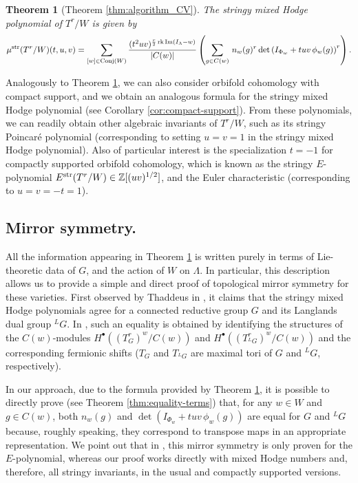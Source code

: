 \documentclass[11pt,english]{amsart}
\numberwithin{equation}{section}
\numberwithin{figure}{section}
\theoremstyle{plain}
\newtheorem{theintro}{Theorem}
\theoremstyle{plain}
\theoremstyle{definition}
\theoremstyle{remark}
\DeclareMathOperator{\image}{Im}
\newcommand{\ZZ}{\mathbb{Z}}
\newcommand{\rk}{\operatorname{rk}}
\newcommand{\str}{\textup{str}}
\begin{document}
\begin{theintro}[Theorem \ref{thm:algorithm_CV}]\label{thm:main-intro}
    The stringy mixed Hodge polynomial of $T^r/W$ is given by
    \[
        \mu^{\str}(T^r/W)(t,u,v)=\sum_{[w] \in \textup{Conj}(W)}
        \frac{(t^{2}uv)^{\frac{r}{2}\rk \image(I_\Lambda -w)}}{|C(w)|}\left(\sum_{g \in C(w)} \, n_{w}(g)^r \det\left(I_{\Phi_w} + tuv\,\phi_w(g)\right)^r \right).
    \]
\end{theintro}

Analogously to Theorem \ref{thm:main-intro}, we can also consider orbifold cohomology with compact support, and we obtain an analogous formula for the stringy mixed Hodge polynomial (see Corollary \ref{cor:compact-support}). From these polynomials, we can readily obtain other algebraic invariants of $T^r/W$, such as its stringy Poincar\'e polynomial (corresponding to setting $u = v = 1$ in the stringy mixed Hodge polynomial). Also of particular interest is the specialization $t = -1$ for compactly supported orbifold cohomology,  which is known as the stringy $E$-polynomial $E^{\str}(T^r/W) \in \ZZ[(uv)^{1/2}]$, and the Euler characteristic (corresponding to $u = v = -t = 1$). 


\subsection*{Mirror symmetry.} All the information appearing in Theorem \ref{thm:main-intro} is written purely in terms of Lie-theoretic data of $G$, and the action of $W$ on $\Lambda$.
In particular, this description allows us to provide a simple and direct proof of topological mirror symmetry for these varieties. First observed by Thaddeus in \cite{Th}, it claims that the stringy mixed Hodge polynomials agree for a connected reductive group $G$ and its Langlands dual group $^LG$. In \cite{Th}, such an equality is obtained by identifying the structures of the $C(w)$-modules $H^{\bullet}((T_G^r)^w / C(w))$ and $H^{\bullet}((T_{^LG}^r)^w / C(w))$ and the corresponding fermionic shifts ($T_G$ and $T_{^LG}$ are maximal tori of $G$ and $^LG$, respectively).

In our approach, due to the formula provided by Theorem \ref{thm:main-intro}, it is possible to directly prove (see Theorem \ref{thm:equality-terms}) that, for any $w \in W$ and $g \in C(w)$, both $n_w(g)$ and $\det\left(I_{\Phi_w} + tuv\,\phi_w(g)\right)$ are equal for $G$ and $^LG$ because, roughly speaking, they correspond to transpose maps in an appropriate representation. We point out that in \cite{Th}, this mirror symmetry is only proven for the $E$-polynomial, whereas our proof works directly with mixed Hodge numbers and, therefore, all stringy invariants, in the usual and compactly supported versions.
\end{document}

